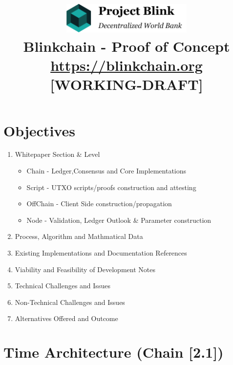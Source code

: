 \documentclass[a4paper,11pt]{article}
\title{

\centering
\includegraphics[width=6.5cm]{logo}\\
\vspace{5mm}
Blinkchain - Proof of Concept\\
\vspace{2mm}
\footnotesize{\url{https://blinkchain.org}}\\
\vspace{3mm}
\small{[WORKING-DRAFT]}}
\date{\vspace{-5ex}}
\begin{document}
\maketitle

\section{Objectives}

\begin{enumerate}
\item Whitepaper Section \& Level
\begin{itemize}
\item Chain - Ledger,Consensus and Core Implementations
\item Script - UTXO scripts/proofs construction and attesting
\item OffChain - Client Side construction/propagation
\item Node - Validation, Ledger Outlook \& Parameter construction
\end{itemize}
\item Process, Algorithm and Mathmatical Data
\item Existing Implementations and Documentation References
\item Viability and Feasibility of Development Notes
\item Technical Challenges and Issues
\item Non-Technical Challenges and Issues
\item Alternatives Offered and Outcome
\end{enumerate}

\section{Time Architecture (Chain [2.1])}
\end{document}
